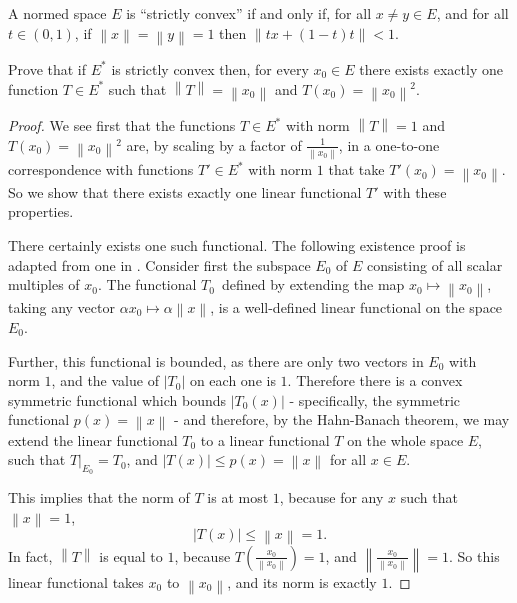 \documentclass[12pt]{article}
\theoremstyle{definition}
\newenvironment{problem}[2][Problem]{\begin{trivlist}
\item[\hskip \labelsep {\bfseries #1}\hskip \labelsep {\bfseries #2.}]}{\end{trivlist}}
\begin{document}
\begin{problem}{4}
	A normed space $E$ is ``strictly convex'' if and only if, for all $x \neq y \in E$, and for all $t \in (0,1)$, if $\left \lVert { x } \right \lVert  = \left \lVert { y } \right \lVert  = 1$ then $\left \lVert { tx + (1-t)t } \right \lVert < 1$.
	\par Prove that if $E^*$ is strictly convex then, for every $x_0 \in E$ there exists exactly one function $T \in E^*$ such that $\left \lVert { T } \right \lVert = \left \lVert { x_0 } \right \lVert $ and $T(x_0) = \left \lVert { x_0 } \right \lVert^2$.
\end{problem}
\begin{proof}
	We see first that the functions $T \in E^*$ with norm $\left \lVert { T } \right \lVert  = 1$ and $T(x_0) = \left \lVert { x_0 } \right \lVert ^2$ are, by scaling by a factor of $\frac{1}{\left \lVert { x_0 } \right \lVert }$, in a one-to-one correspondence with functions $T' \in E^*$ with norm $ 1  $ that take $T'(x_0) = \left \lVert { x_0 } \right \lVert $. So we show that there exists exactly one linear functional $T'$ with these properties.
	\par There certainly exists one such functional. The following existence proof is adapted from one in \cite{bachman}. Consider first the subspace $E_0$ of $E$ consisting of all scalar multiples of $x_0$. The functional $T_0$ defined by extending the map $x_0 \mapsto \left \lVert {  x_0 } \right \lVert $, taking any vector $\alpha x_0 \mapsto \alpha\left \lVert { x } \right \lVert $, is a well-defined linear functional on the space $E_0$.
	\par Further, this functional is bounded, as there are only two vectors in $E_0$ with norm $1$, and the value of $\left \lvert { T_0 } \right \lvert $ on each one is $1$. Therefore there is a convex symmetric functional which bounds $\lvert T_0(x) \rvert$ - specifically, the symmetric functional $p(x) = \left \lVert { x } \right \lVert $ - and therefore, by the Hahn-Banach theorem, we may extend the linear functional $T_0$ to a linear functional $T$ on the whole space $E$, such that $T\rvert_{E_0} = T_0$, and  $\lvert T(x) \rvert \leq p(x) = \left \lVert { x } \right \lVert $ for all $x \in E$. 
	\par This implies that the norm of $T$ is at most $1$, because for any $x$ such that $\left \lVert {  x } \right \lVert  = 1$, 
	\[ \left \lvert { T(x) } \right \lvert  \leq \left \lVert { x } \right \lVert  = 1.\]
	In fact, $\left \lVert { T } \right \lVert $ is equal to $1$, because $T(\frac{x_0}{\left \lVert { x_0 } \right \lVert }) = 1$, and $\left \lVert { \frac{x_0}{\left \lVert { x_0 } \right \lVert } } \right \lVert  = 1$. So this linear functional takes $x_0$ to $\left \lVert { x_0 } \right \lVert $, and its norm is exactly $1$.

\end{proof}
\end{document}
